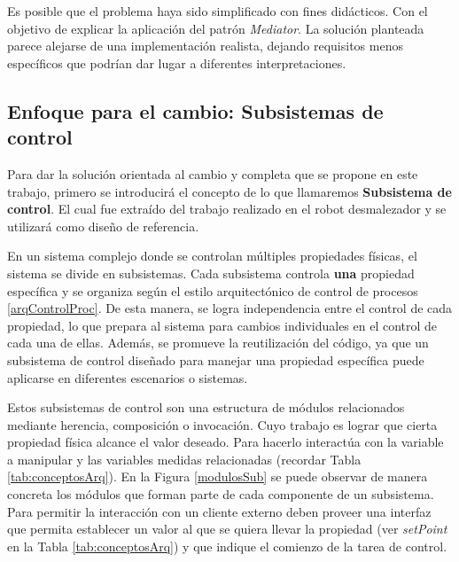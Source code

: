 Es posible que el problema haya sido simplificado con fines didácticos. Con el objetivo de explicar la aplicación del patrón \textit{Mediator}. La solución planteada parece alejarse de una implementación realista, dejando requisitos menos específicos que podrían dar lugar a diferentes interpretaciones.



\subsection*{Enfoque para el cambio: Subsistemas de control}
\label{subsistema}

Para dar la solución orientada al cambio y completa que se propone en este trabajo, primero se introducirá el concepto de lo que llamaremos \textbf{Subsistema de control}. El cual fue extraído del trabajo realizado en el robot desmalezador \citep{paperPomponio} y se utilizará como diseño de referencia.

En un sistema complejo donde se controlan múltiples propiedades físicas, el sistema se divide en subsistemas. Cada subsistema controla \textbf{una} propiedad específica y se organiza según el estilo arquitectónico de control de procesos \ref{arqControlProc}. De esta manera, se logra independencia entre el control de cada propiedad, lo que prepara al sistema para cambios individuales en el control de cada una de ellas. Además, se promueve la reutilización del código, ya que un subsistema de control diseñado para manejar una propiedad específica puede aplicarse en diferentes escenarios o sistemas.

Estos subsistemas de control son una estructura de módulos relacionados mediante herencia, composición o invocación. Cuyo trabajo es lograr que cierta propiedad física alcance el valor deseado. Para hacerlo interactúa con la variable a manipular y las variables medidas relacionadas (recordar Tabla \ref{tab:conceptosArq}). En la Figura \ref{modulosSub} se puede observar de manera concreta los módulos que forman parte de cada componente de un subsistema. Para permitir la interacción con un cliente externo deben proveer una interfaz que permita establecer un valor al que se quiera llevar la propiedad (ver \textit{setPoint} en la Tabla \ref{tab:conceptosArq}) y que indique el comienzo de la tarea de control.

